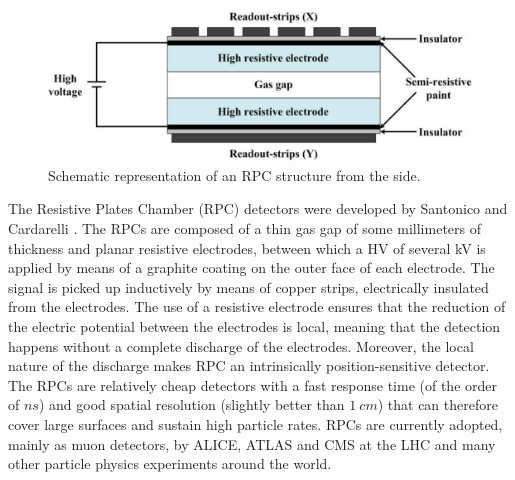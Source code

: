 \begin{figure}[!t]
\begin{center}
\includegraphics[width=0.8\linewidth]{Chapters/Performance/Figs/RPCside.pdf}
\caption{Schematic representation of an RPC structure from the side.}
\label{fig:RPCside}
\end{center}
\end{figure}

The Resistive Plates Chamber (RPC) detectors were developed by Santonico and Cardarelli \cite{Santonico:1981sc}.
The RPCs are composed of a thin gas gap of some millimeters of thickness and planar resistive electrodes, between which a HV of several kV is applied by means of a graphite coating on the outer face of each electrode.
The signal is picked up inductively by means of copper strips, electrically insulated from the electrodes. 
The use of a resistive electrode ensures that the reduction of the electric potential between the electrodes is local, meaning that the detection happens without a complete discharge of the electrodes.
Moreover, the local nature of the discharge makes RPC an intrinsically position-sensitive detector.
The RPCs are relatively cheap detectors with a fast response time (of the order of $ns$) and good spatial resolution (slightly better than $1\ cm$) that can therefore cover large surfaces and sustain high particle rates.
RPCs are currently adopted, mainly as muon detectors, by ALICE, ATLAS and CMS at the LHC and many other particle physics experiments around the world.


